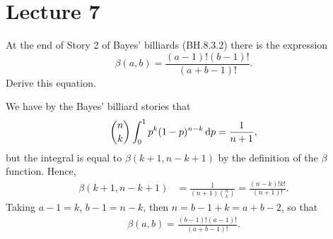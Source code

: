 \section{Lecture 7}
\label{sec:lecture-7}

\begin{exercise}
At the end of Story 2 of Bayes' billiards (BH.8.3.2) there is the expression
\begin{equation}
\label{eq:2}
\beta(a,b) = \frac{(a-1)!(b-1)!}{(a+b-1)!}.
\end{equation}
Derive this equation.
\begin{solution}
We have by the Bayes' billiard stories that
\begin{align}
  \label{}
{n \choose k} \int_0^1 p^k(1-p)^{n-k}\,\textrm{d}p = \frac{1}{n+1},
\end{align}
but the integral is equal to $\beta(k+1, n-k+1)$ by the definition of the $\beta$ function. Hence,
\begin{align*}
\beta(k+1, n-k+1)
&= \frac{1}{(n+1) {n \choose k}} = \frac{(n-k)!k!}{(n+1)!}.
\end{align*}
Taking $a-1 = k$, $b-1 =n -k$, then $n=b-1+k = a+b-2$, so that
\begin{align*}
\beta(a, b) = \frac{(b-1)!(a-1)!}{(a+b-1)!}.
\end{align*}
\end{solution}
\end{exercise}

